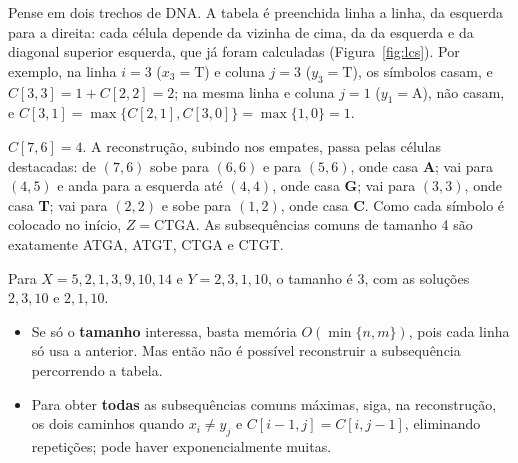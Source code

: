 \begin{exemplo}[$X=\mathrm{CATGACT}$ e $Y=\mathrm{ACTGTA}$]\label{ex:lcs}
Pense em dois trechos de DNA. A tabela é preenchida linha a linha, da esquerda para a direita: cada célula depende da vizinha de cima, da da esquerda e da diagonal superior esquerda, que já foram calculadas (Figura~\ref{fig:lcs}). Por exemplo, na linha $i=3$ ($x_3=\mathrm{T}$) e coluna $j=3$ ($y_3=\mathrm{T}$), os símbolos casam, e $C[3,3]=1+C[2,2]=2$; na mesma linha e coluna $j=1$ ($y_1=\mathrm{A}$), não casam, e $C[3,1]=\max\{C[2,1],C[3,0]\}=\max\{1,0\}=1$.

$C[7,6]=4$. A reconstrução, subindo nos empates, passa pelas células destacadas: de $(7,6)$ sobe para $(6,6)$ e para $(5,6)$, onde casa \textbf{A}; vai para $(4,5)$ e anda para a esquerda até $(4,4)$, onde casa \textbf{G}; vai para $(3,3)$, onde casa \textbf{T}; vai para $(2,2)$ e sobe para $(1,2)$, onde casa \textbf{C}. Como cada símbolo é colocado no início, $Z=\mathrm{CTGA}$. As subsequências comuns de tamanho 4 são exatamente ATGA, ATGT, CTGA e CTGT.
\begin{figura}
\end{figura}
\end{exemplo}
Para $X=5,2,1,3,9,10,14$ e $Y=2,3,1,10$, o tamanho é 3, com as soluções $2,3,10$ e $2,1,10$.
\begin{itemize}
  \item Se só o \textbf{tamanho} interessa, basta memória $O(\min\{n,m\})$, pois cada linha só usa a anterior. Mas então não é possível reconstruir a subsequência percorrendo a tabela.
  \item Para obter \textbf{todas} as subsequências comuns máximas, siga, na reconstrução, os dois caminhos quando $x_i\ne y_j$ e $C[i-1,j]=C[i,j-1]$, eliminando repetições; pode haver exponencialmente muitas.
\end{itemize}

